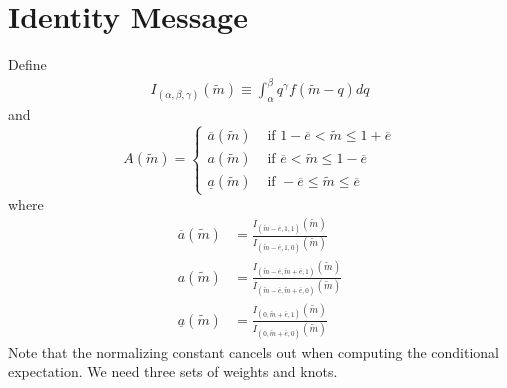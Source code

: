 \documentclass{article}
\begin{document}
\section{Identity Message}
Define
\begin{align}
	I_{(\alpha,\beta,\gamma)}(\widetilde{m})\equiv\int_{\alpha}^{\beta}{q^{\gamma}f(\tilde{m}-q)dq}
\end{align}
and
\begin{equation}
	A(\widetilde{m})=
	\begin{cases}
		\overline{a}(\widetilde{m}) & \text{ if } 1-\overline{e}<\widetilde{m}\leq 1+\overline{e}\\
		a(\widetilde{m}) & \text{ if } \overline{e}<\widetilde{m}\leq 1-\overline{e}\\
		\underline{a}(\widetilde{m}) & \text{ if } -\overline{e}\leq\widetilde{m}\leq \overline{e}
	\end{cases}
\end{equation}
where
\begin{align}
	\overline{a}(\widetilde{m})&=\frac{I_{(\widetilde{m}-\bar{e},1,1)}(\widetilde{m})}{I_{(\widetilde{m}-\bar{e},1,0)}(\widetilde{m})}\\
	a(\widetilde{m})&=\frac{I_{(\widetilde{m}-\bar{e},\widetilde{m}+\bar{e},1)}(\widetilde{m})}{I_{(\widetilde{m}-\bar{e},\widetilde{m}+\bar{e},0)}(\widetilde{m})}\\
	\underline{a}(\widetilde{m})&=\frac{I_{(0,\widetilde{m}+\bar{e},1)}(\widetilde{m})}{I_{(0,\widetilde{m}+\bar{e},0)}(\widetilde{m})}
\end{align}
Note that the normalizing constant cancels out when computing the conditional expectation. We need three sets of weights and knots. 
\end{document}

